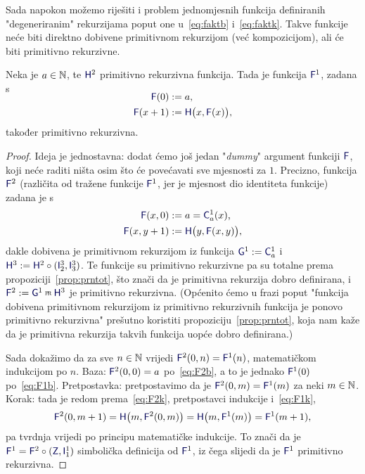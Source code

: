 Sada napokon možemo riješiti i problem jednomjesnih funkcija definiranih "degeneriranim" rekurzijama poput one u~\eqref{eq:faktb} i~\eqref{eq:faktk}. Takve funkcije neće biti direktno dobivene primitivnom rekurzijom (već kompozicijom), ali će biti primitivno rekurzivne.

\begin{propozicija}[{name=[jednomjesna funkcija primitivnom rekurzijom]}]\label{prop:F1prn}
Neka je $a\in{\mathbb N}$, te $\f H^2$ primitivno rekurzivna funkcija.
    \newline Tada je funkcija $\f F^1$, zadana s
\begin{align}
\SwapAboveDisplaySkip
\label{eq:F1b}
    \f F(0)&:=a\text,\\
\label{eq:F1k}
    \f F(x+1)&:=\f H\bigl(x,\f F(x)\bigr)\text,
\end{align}
također primitivno rekurzivna.
\end{propozicija}
\begin{proof}
Ideja je jednostavna: dodat ćemo još jedan "\!\emph{dummy}" argument funkciji $\f F$, koji neće raditi ništa osim što će povećavati sve mjesnosti za $1$. Precizno, funkcija $\f F^2$ (različita od tražene funkcije $\f F^1$\!, jer je mjesnost dio identiteta funkcije) zadana je s
\begin{align}
\label{eq:F2b}
    \f F(x,0)&:=a=\f C_a^1(x)\text,\\
\label{eq:F2k}
    \f F(x,y+1)&:=\f H\bigl(y,\f F(x,y)\bigr)\text,
\end{align}
dakle dobivena je primitivnom rekurzijom iz funkcija $\f G^1:=\f C_a^1$ i $\f H^3:=\f H^2\circ(\f I_2^3,\f I_3^3)$. Te funkcije su primitivno rekurzivne pa su totalne prema propoziciji~\ref{prop:prntot}, što znači da je primitivna rekurzija dobro definirana, i $\f F^2:=\f G^1\pr\f H^3$ je primitivno rekurzivna. (Općenito ćemo u frazi poput "funkcija dobivena primitivnom rekurzijom iz primitivno rekurzivnih funkcija je ponovo primitivno rekurzivna" prešutno koristiti propoziciju~\ref{prop:prntot}, koja nam kaže da je primitivna rekurzija takvih funkcija uopće dobro definirana.)

Sada dokažimo da za sve $n\in{\mathbb N}$ vrijedi $\f F^2(0,n)=\f F^1(n)$, matematičkom indukcijom po $n$. Baza: $\f F^2(0,0)=a$ po~\eqref{eq:F2b}, a to je jednako $\f F^1(0)$ po~\eqref{eq:F1b}. Pretpostavka: pretpostavimo da je $\f F^2(0,m)=\f F^1(m)$ za neki $m\in{\mathbb N}$. Korak: tada je redom prema~\eqref{eq:F2k}, pretpostavci indukcije i~\eqref{eq:F1k},
\begin{equation}
    \f F^2(0,m+1)=\f H\bigl(m,\f F^2(0,m)\bigr)=\f H\bigl(m,\f F^1(m)\bigr)=\f F^1(m+1)\text,
\end{equation}
pa tvrdnja vrijedi po principu matematičke indukcije. To znači da je $\f F^1=\f F^2\circ(\f Z,\f I_1^1)$ simbolička definicija od $\f F^1$, iz čega slijedi da je $\f F^1$ primitivno rekurzivna.
\end{proof}

